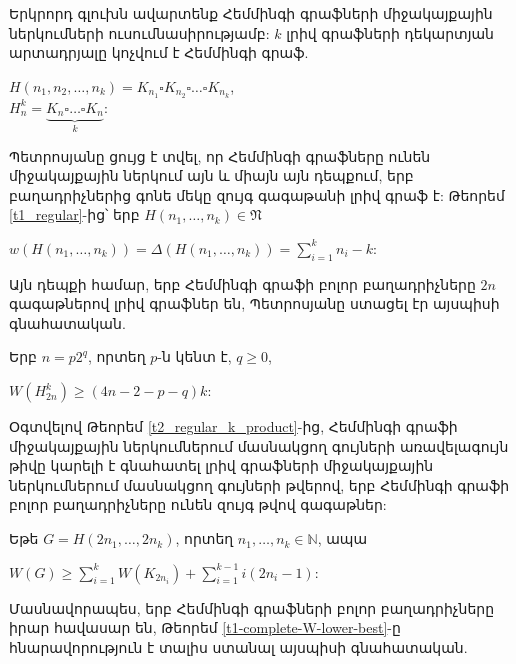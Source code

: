 Երկրորդ գլուխն ավարտենք Հեմմինգի գրաֆների միջակայքային ներկումների ուսումնասիրությամբ: $k$ լրիվ գրաֆների դեկարտյան արտադրյալը կոչվում է Հեմմինգի գրաֆ.
\begin{center}
$ H(n_1,n_2,\ldots,n_k) = K_{n_1} \square K_{n_2} \square \ldots \square K_{n_k}$,\\
$ H_n^k = \underset{k}{\underbrace{K_n \square \ldots \square K_n}}$:
\end{center}

Պետրոսյանը \cite{Petrosyan2011} ցույց է տվել, որ Հեմմինգի գրաֆները ունեն միջակայքային ներկում այն և միայն այն դեպքում, երբ բաղադրիչներից գոնե մեկը զույգ գագաթանի լրիվ գրաֆ է: Թեորեմ \ref{t1_regular}-ից՝ երբ $H(n_1,\ldots,n_k)\in \mathfrak{N}$
\begin{center}
$w(H(n_1,\ldots,n_k))=\Delta(H(n_1,\ldots,n_k))=\sum\limits_{i=1}^k{n_i}-k$:
\end{center}

Այն դեպքի համար, երբ Հեմմինգի գրաֆի բոլոր բաղադրիչները $2n$ գագաթներով լրիվ գրաֆներ են, Պետրոսյանը \cite{Petrosyan2011} ստացել էր այսպիսի գնահատական.
\begin{theorem}
\label{t2_Hamming_balanced_lower_old} Երբ $n=p2^q$, որտեղ $p$-ն կենտ է, $q\geq0$,
\begin{center}
$W(H_{2n}^k) \geq (4n-2-p-q)k$:
\end{center}
\end{theorem}

Օգտվելով Թեորեմ \ref{t2_regular_k_product}-ից, Հեմմինգի գրաֆի միջակայքային ներկումներում մասնակցող գույների առավելագույն թիվը կարելի է գնահատել լրիվ գրաֆների միջակայքային ներկումներում մասնակցող գույների թվերով, երբ Հեմմինգի գրաֆի բոլոր բաղադրիչները ունեն զույգ թվով գագաթներ:
\begin{theorem}
\label{t2_Hamming_balanced_lower} Եթե $G = H(2n_1,\ldots,2n_k)$, որտեղ $n_1,\ldots,n_k \in \mathbb{N}$, ապա
\begin{center}
$W(G) \geq \sum\limits_{i=1}^k{W(K_{2n_i})}+\sum\limits_{i=1}^{k-1}{i\left(2n_i-1\right)}$:
\end{center}
\end{theorem}
Մասնավորապես, երբ Հեմմինգի գրաֆների բոլոր բաղադրիչները իրար հավասար են, Թեորեմ \ref{t1-complete-W-lower-best}-ը հնարավորություն է տալիս ստանալ այսպիսի գնահատական.


